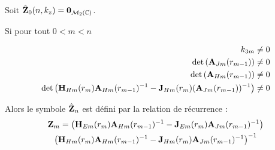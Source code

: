         \begin{thm}
            Soit $\hat {\mathbf{Z}}_0(n,k_z) = \mathbf{0}_{\mathcal{M}_2(\mathbb C)}$.

            Si pour tout $0 < m < n$

            \begin{subequations}
                \begin{align}
                    k_{3m} & \not = 0 \\
                    \det\left(\mathbf{A}_{Jm}(r_{m-1})\right) & \not = 0 \\
                    \det\left(\mathbf{A}_{Hm}(r_{m-1})\right) & \not = 0 \\
                    \det\left(\mathbf{H}_{Hm}(r_{m})\mathbf{A}_{Hm}(r_{m-1})^{-1} - \mathbf{J}_{Hm}(r_{m})(\mathbf{A}_{Jm}(r_{m-1}))^{-1}\right) &\not = 0
                \end{align}
            \end{subequations}

            Alors le symbole $\hat {\mathbf{Z}}_n$ est défini par la relation de récurrence : 
            \begin{multline}
                \mathbf{Z}_m = \left(\mathbf{H}_{Em}(r_m)\mathbf{A}_{Hm}(r_{m-1})^{-1} - \mathbf{J}_{Em}(r_m)\mathbf{A}_{Jm}(r_{m-1})^{-1}\right) \\
                        \left(\mathbf{H}_{Hm}(r_m)\mathbf{A}_{Hm}(r_{m-1})^{-1} - \mathbf{J}_{Hm}(r_m)\mathbf{A}_{Jm}(r_{m-1})^{-1}\right)^{-1}
            \end{multline}
        \end{thm}

